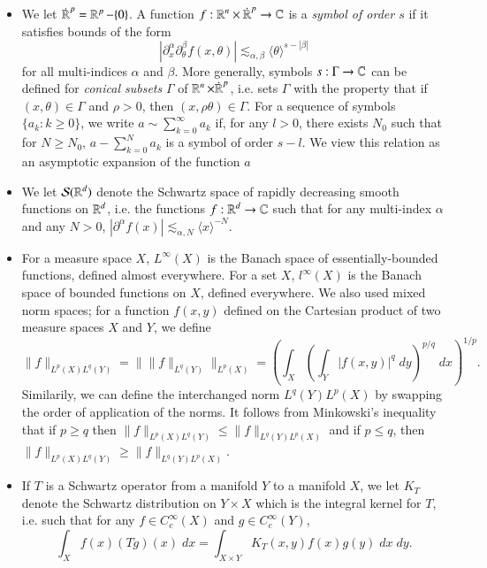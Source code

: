 \begin{itemize}
    \item We let $\dot{\operatorname{\mathbb{R}}}^p = \operatorname{\mathbb{R}}^p - \{ 0 \}$. A function $f: {\operatorname{\mathbb{R}}^n} \times {\dot{\operatorname{\mathbb{R}}}^p} \to \operatorname{\mathbb{C}}$ is a \emph{symbol of order $s$} if it satisfies bounds of the form
    \[ | \partial_x^\alpha \partial_\theta^\beta f (x,\theta) | \lesssim_{\alpha,\beta} \langle \theta \rangle^{s - |\beta|} \]
    for all multi-indices $\alpha$ and $\beta$. More generally, symbols $s: \Gamma \to \operatorname{\mathbb{C}}$ can be defined for \emph{conical subsets} $\Gamma$ of $\operatorname{\mathbb{R}}^n \times \dot{\operatorname{\mathbb{R}}}^p$, i.e. sets $\Gamma$ with the property that if $(x,\theta) \in \Gamma$ and $\rho > 0$, then $(x,\rho \theta) \in \Gamma$. For a sequence of symbols $\{ a_k : k \geq 0 \}$, we write $a \sim \sum_{k = 0}^\infty a_k$ if, for any $l > 0$, there exists $N_0$ such that for $N \geq N_0$, $a - \sum_{k = 0}^N a_k$ is a symbol of order $s - l$. We view this relation as an asymptotic expansion of the function $a$

    \item We let $\mathcal{S}(\operatorname{\mathbb{R}}^d)$ denote the Schwartz space of rapidly decreasing smooth functions on $\operatorname{\mathbb{R}}^d$, i.e. the functions $f: \operatorname{\mathbb{R}}^d \to \operatorname{\mathbb{C}}$ such that for any multi-index $\alpha$ and any $N > 0$, $|\partial^\alpha f(x)| \lesssim_{\alpha,N} \langle x \rangle^{-N}$.

    \item For a measure space $X$, $L^\infty(X)$ is the Banach space of essentially-bounded functions, defined almost everywhere. For a set $X$, $l^\infty(X)$ is the Banach space of bounded functions on $X$, defined everywhere. We also used mixed norm spaces; for a function $f(x,y)$ defined on the Cartesian product of two measure spaces $X$ and $Y$, we define
    \[ \| f \|_{L^p(X) L^q(Y)} = \big\| \| f \|_{L^q(Y)} \big\|_{L^p(X)} = \left( \int\nolimits_X \left( \int\nolimits_Y |f(x,y)|^q\; dy \right)^{p/q}\; dx \right)^{1/p}. \]
    Similarily, we can define the interchanged norm $L^q(Y) L^p(X)$ by swapping the order of application of the norms. It follows from Minkowski's inequality that if $p \geq q$ then $\| f \|_{L^p(X) L^q(Y)} \leq \| f \|_{L^q(Y) L^p(X)}$ and if $p \leq q$, then $\| f \|_{L^p(X) L^q(Y)} \geq \| f \|_{L^q(Y) L^p(X)}$.

    \item If $T$ is a Schwartz operator from a manifold $Y$ to a manifold $X$, we let $K_T$ denote the Schwartz distribution on $Y \times X$ which is the integral kernel for $T$, i.e. such that for any $f \in C_c^\infty(X)$ and $g \in C_c^\infty(Y)$,
    \[ \int_X f(x) (Tg)(x)\; dx = \int_{X \times Y} K_T(x,y) f(x) g(y)\; dx\; dy. \]


\end{itemize}
